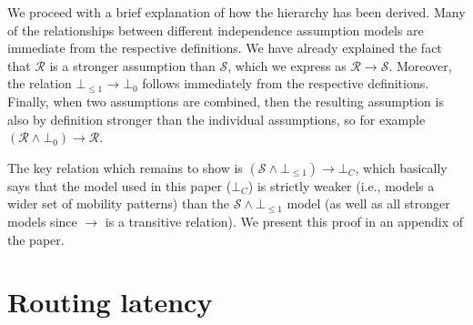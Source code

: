 \documentclass{article}
\begin{document}
We proceed with a brief explanation of how the hierarchy has been
derived. Many of the relationships between different independence
assumption models are immediate from the respective definitions. We
have already explained the fact that $\mathcal{R}$ is a stronger
assumption than $\mathcal{S}$, which we express as $\mathcal{R} \rightarrow
\mathcal{S}$. Moreover, the relation $\bot_{\le 1} \rightarrow \bot_0$
follows immediately from the respective definitions. Finally, when two
assumptions are combined, then the resulting assumption is also by
definition stronger than the individual assumptions, so for example
$(\mathcal{R}\land \bot_0) \rightarrow \mathcal{R}$.

The key relation which remains to show is $(\mathcal{S} \land
\bot_{\le 1}) \rightarrow \bot_C$, which basically says that the model
used in this paper ($\bot_C$) is strictly weaker (i.e., models a wider
set of mobility patterns) than the $\mathcal{S} \land \bot_{\le 1}$
model (as well as all stronger models since $\rightarrow$ is a
transitive relation). We present this proof in an appendix of the
paper. 

\section{Routing latency}
\label{sec:latency}
\end{document}
